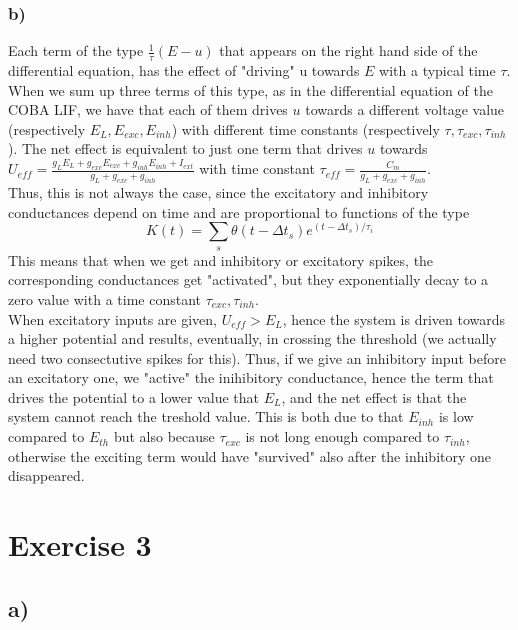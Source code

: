\documentclass[11pt]{article}
\begin{document}
    \subsubsection*{b)}\label{b}

    Each term of the type $\frac{1}{\tau} \left(E - u\right)$ that appears
on the right hand side of the differential equation, has the effect of
"driving" u towards $E$ with a typical time $\tau$. When we sum up three
terms of this type, as in the differential equation of the COBA LIF, we
have that each of them drives $u$ towards a different voltage value
(respectively $E_L, E_{exc}, E_{inh}$) with different time constants
(respectively $\tau, \tau_{exc}, \tau_{inh}$). The net effect is
equivalent to just one term that drives $u$ towards
$U_{eff} = \frac{g_L E_L + g_{exc} E_{exc} + g_{inh} E_{inh} + I_{ext}}{g_L + g_{exc} + g_{inh}}$
with time constant
$\tau_{eff} = \frac{C_m}{g_L + g_{exc} + g_{inh}}$.\\Thus, this is not
always the case, since the excitatory and inhibitory conductances depend
on time and are proportional to functions of the type
\[ K(t) = \sum_{s} \theta(t - \Delta t_s) e^{(t - \Delta t_s)/\tau_i}\]
This means that when we get and inhibitory or excitatory spikes, the
corresponding conductances get "activated", but they exponentially decay
to a zero value with a time constant $\tau_{exc}, \tau_{inh}$.\\When
excitatory inputs are given, $U_{eff} > E_L$, hence the system is driven
towards a higher potential and results, eventually, in crossing the
threshold (we actually need two consectutive spikes for this). Thus, if
we give an inhibitory input before an excitatory one, we "active" the
inihibitory conductance, hence the term that drives the potential to a
lower value that $E_L$, and the net effect is that the system cannot
reach the treshold value. This is both due to that $E_{inh}$ is low
compared to $E_{th}$ but also because $\tau_{exc}$ is not long enough
compared to $\tau_{inh}$, otherwise the exciting term would have
"survived" also after the inhibitory one disappeared.

    \section*{Exercise 3}\label{exercise-3}

\subsection*{a)}\label{a}
\end{document}
